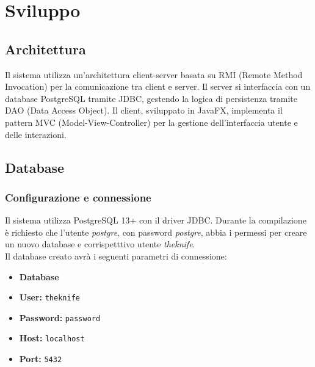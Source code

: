 \section{Sviluppo}
\subsection{Architettura}
Il sistema utilizza un'architettura client-server basata su 
RMI (Remote Method Invocation) per la comunicazione tra client 
e server.
Il server si interfaccia con un database PostgreSQL tramite JDBC,
gestendo la logica di persistenza tramite DAO (Data Access Object).
Il client, sviluppato in JavaFX, implementa il pattern MVC (Model-View-Controller)
per la gestione dell'interfaccia utente e delle interazioni.
\subsection{Database}
\subsubsection{Configurazione e connessione}
\label{sec:db-connessione}
Il sistema utilizza PostgreSQL 13+ con il driver JDBC.
Durante la compilazione è richiesto che l'utente \textit{postgre},
con password \textit{postgre}, abbia i permessi per creare un 
nuovo database e corrispetttivo utente \textit{theknife}.\\
Il database creato avrà i seguenti parametri di connessione:
\begin{itemize}
    \item \textbf{Database} \texttt{}
    \item \textbf{User:} \texttt{theknife}
    \item \textbf{Password:} \texttt{password}
    \item \textbf{Host:} \texttt{localhost}
    \item \textbf{Port:} \texttt{5432}
\end{itemize}

